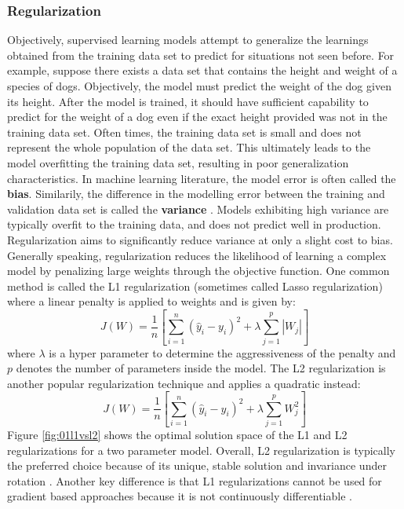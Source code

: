 \subsubsection{Regularization}
Objectively, supervised learning models attempt to generalize the learnings obtained from the training data set to predict for situations not seen before. For example, suppose there exists a data set that contains the height and weight of a species of dogs. Objectively, the model must predict the weight of the dog given its height.  After the model is trained, it should have sufficient capability to predict for the weight of a dog even if the exact height provided was not in the training data set.  Often times, the training data set is small and does not represent the whole population of the data set.  This ultimately leads to the model overfitting the training data set, resulting in poor generalization characteristics. In machine learning literature, the model error is often called the \textbf{bias}.  Similarily, the difference in the modelling error between the training and validation data set is called the \textbf{variance} \cite{NN}.  Models exhibiting high variance are typically overfit to the training data, and does not predict well in production.  Regularization aims to significantly reduce variance at only a slight cost to bias. Generally speaking, regularization reduces the likelihood of learning a complex model by penalizing large weights through the objective function.  One common method is called the L1 regularization (sometimes called Lasso regularization) where a linear penalty is applied to weights and is given by:
\begin{equation}
    J(W) = \frac{1}{n} \left[\sum\limits^n_{i=1}(\hat{y}_i - y_i)^2 + \lambda \sum\limits^p_{j=1} |W_j| \right]
    \label{eq:01L1}
\end{equation}
where $\lambda$ is a hyper parameter to determine the aggressiveness of the penalty and $p$ denotes the number of parameters inside the model. The L2 regularization is another popular regularization technique and applies a quadratic instead:
\begin{equation}
    J(W) = \frac{1}{n} \left[\sum\limits^n_{i=1}(\hat{y}_i - y_i)^2 + \lambda \sum\limits^p_{j=1} W_j^2 \right]
    \label{eq:01L2}
\end{equation}
Figure \ref{fig:01l1vsl2} shows the optimal solution space of the L1 and L2 regularizations for a two parameter model. Overall, L2 regularization is typically the preferred choice because of its unique, stable solution and invariance under rotation \cite{l1_l2}. Another key difference is that L1 regularizations cannot be used for gradient based approaches because it is not continuously differentiable \cite{l1_diff}. 

